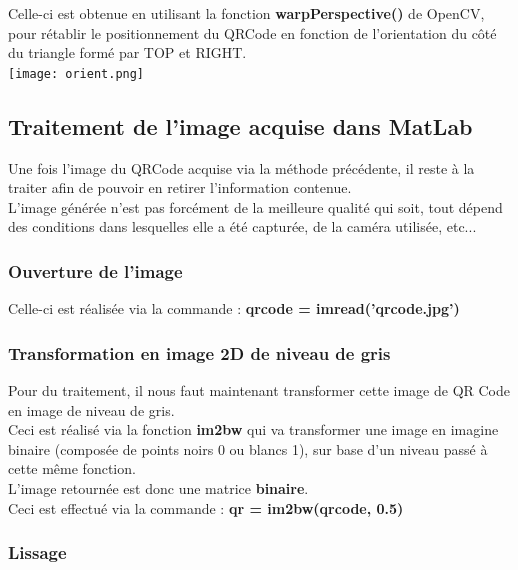 \documentclass{report}
\begin{document}
			Celle-ci est obtenue en utilisant la fonction \textbf{warpPerspective()} de OpenCV, pour rétablir le positionnement du QRCode en fonction de l'orientation du côté du triangle formé par TOP et RIGHT.\\

			\texttt{[image: orient.png]}\\

		\subsection{Traitement de l'image acquise dans MatLab}

			Une fois l'image du QRCode acquise via la méthode précédente, il reste à la traiter afin de pouvoir en retirer l'information contenue.\\

			L'image générée n'est pas forcément de la meilleure qualité qui soit, tout dépend des conditions dans lesquelles elle a été capturée, de la caméra utilisée, etc...\\

			\subsubsection{Ouverture de l'image}

				Celle-ci est réalisée via la commande : \textbf{qrcode = imread('qrcode.jpg')}

			\subsubsection{Transformation en image 2D de niveau de gris}

				Pour du traitement, il nous faut maintenant transformer cette image de QR Code en image de niveau de gris.\\

				Ceci est réalisé via la fonction \textbf{im2bw} qui va transformer une image en imagine binaire (composée de points noirs 0 ou blancs 1), sur base d'un niveau passé à cette même fonction.\\
				L'image retournée est donc une matrice \textbf{binaire}.\\

				Ceci est effectué via la commande : \textbf{qr = im2bw(qrcode, 0.5)}

			\subsubsection{Lissage}
\end{document}
